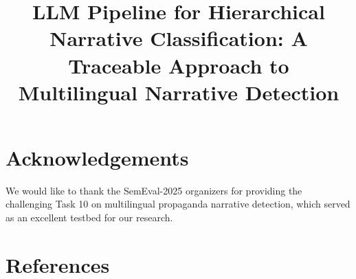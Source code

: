 \documentclass[10pt, a4paper]{article}
\title{LLM Pipeline for Hierarchical Narrative Classification: A Traceable Approach to Multilingual Narrative Detection}
\begin{document}
\maketitleabstract










\section*{Acknowledgements}

We would like to thank the SemEval-2025 organizers for providing the challenging Task 10 on multilingual propaganda narrative detection, which served as an excellent testbed for our research.

\appendix


\section*{References}



\end{document}
